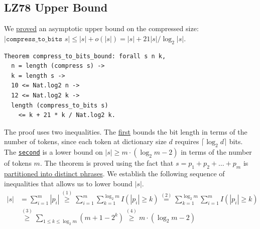 \documentclass[
  a4paper, twocolumn, DIV=calc]{scrartcl}
\begin{document}
\subsection{LZ78 Upper Bound}
We \href{https://github.com/Jatana/LZ78FormalVerification/blob/2819b54b6eb88639461c4fd3504fbc2a87e8cbc0/lz78/LZ.v#L1469}{proved}
an asymptotic upper bound on the compressed size:
$|\texttt{compress\_to\_bits } s| \leqslant |s| + o(|s|) = |s| + 21|s|/\log_2|s|.$
\begin{verbatim}
Theorem compress_to_bits_bound: forall s n k,
  n = length (compress s) ->
  k = length s ->
  10 <= Nat.log2 n ->
  12 <= Nat.log2 k ->
  length (compress_to_bits s)
    <= k + 21 * k / Nat.log2 k.
\end{verbatim}

The proof uses two inequalities. The
\href{https://github.com/Jatana/LZ78FormalVerification/blob/2819b54b6eb88639461c4fd3504fbc2a87e8cbc0/lz78/LZ.v#L184}{first}
bounds the bit length in 
terms of the number of tokens, since each token at dictionary size $d$
requires $\lceil \log_2 d\rceil$ bits.
The \href{https://github.com/Jatana/LZ78FormalVerification/blob/2819b54b6eb88639461c4fd3504fbc2a87e8cbc0/lz78/LZ.v#L1124C9-L1124C41}{\texttt{second}}
is a lower bound on $|s| \geqslant m \cdot (\log_2 m - 2)$ in terms of the
number of tokens $m$. The theorem is proved using the fact that $s = p_1 + p_2 +
\ldots + p_m$ is
\href{https://github.com/Jatana/LZ78FormalVerification/blob/2819b54b6eb88639461c4fd3504fbc2a87e8cbc0/lz78/LZ.v#L256}{partitioned into distinct phrases}.
We establish the following sequence of inequalities that allows us to lower
bound $|s|$.
\begin{align*}
|s| &= \sum_{i=1}^m |p_i|
        \overset{(1)}{\geqslant} \sum_{i=1}^m\sum_{k=1}^{\log_2 m} I(|p_i| \geqslant k)
        \overset{(2)}{=} \sum_{k=1}^{\log_2 m} \sum_{i=1}^m I(|p_i| \geqslant k) \\
    &\overset{(3)}{\geqslant} \sum_{1 \leqslant k \leqslant \log_2 m} (m + 1 - 2^k)
     \overset{(4)}{\geqslant} m \cdot (\log_2 m - 2)
\end{align*}
\end{document}
